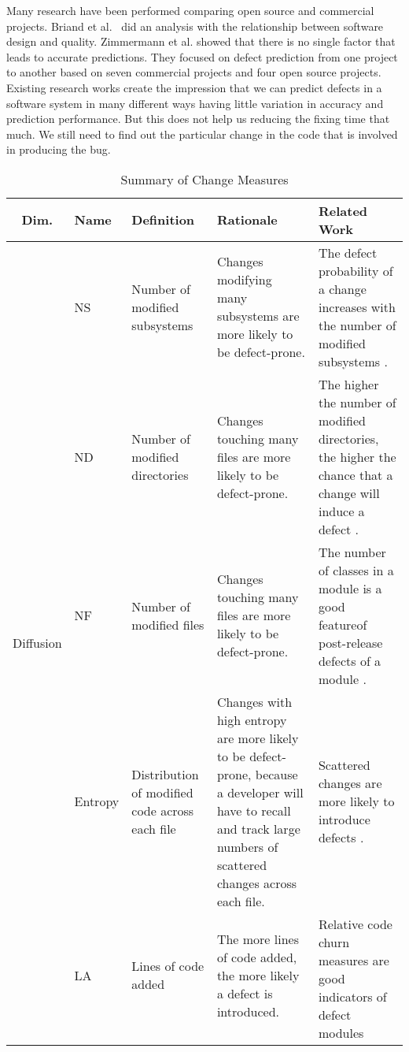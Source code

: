 \documentclass[10pt, conference]{IEEEtran}
\begin{document}
Many research have been performed comparing open source and commercial projects. Briand et al.~\cite{Briand1999ICSE} did an analysis with the relationship between software design and quality. Zimmermann et al.\cite{Zimmermann2009ESECS} showed that there is no single factor that leads to accurate predictions. They focused on defect prediction from one project to another based on seven commercial projects and four open source projects. Existing research works create the impression that we can predict defects in a software system in many different ways having little variation in accuracy and prediction performance. But this does not help us reducing the fixing time that much. We still need to find out the particular change in the code that is involved in producing the bug.

\begin{table*}[t]
	\centering
	\caption{Summary of Change Measures}
	\begin{tabular}{|c|l|p{2.5cm}|p{5.5cm}|p{5.25cm}|}
		\hline Dim. & Name & Definition & Rationale & Related Work \\ 
		\hline \multirow{14}{*}{\begin{sideways}Diffusion\end{sideways}} & NS & Number of modified subsystems  & Changes modifying many subsystems are more likely to be defect-prone. & The defect probability of a change increases with the number of modified subsystems \cite{Mockus2000Bell}. \\ \cline{2-5}  
		& ND & Number of modified directories & Changes touching many files are more likely to be defect-prone. & The higher the number of modified directories, the higher the chance that a change will induce a defect \cite{Mockus2000Bell}. \\ \cline{2-5}  
		& NF & Number of modified files & Changes touching many files are more likely to be defect-prone. & The number of classes in a module is a good featureof post-release defects of a module \cite{Nagappan2006ICSE}. \\ \cline{2-5} 
		& Entropy & Distribution of modified code across each file & Changes with high entropy are more likely to be defect-prone, because a developer will have to recall and track large numbers of scattered changes across each file. & Scattered changes are more likely to introduce defects \cite{DAmbross2010MSR, Hassan2009ICSE}. \\ 
		\hline \multirow{4}{*}{\begin{sideways}Size\end{sideways}} & LA & Lines of code added & The more lines of code added, the more likely a defect is introduced. & \multirow{2}{5.25cm}{Relative code churn measures are good indicators of defect modules \cite{Moser2008ICSE, Nagappan2005ICSE}}. \\ \cline{2-4} 

\end{tabular}
\end{table*}
\end{document}
